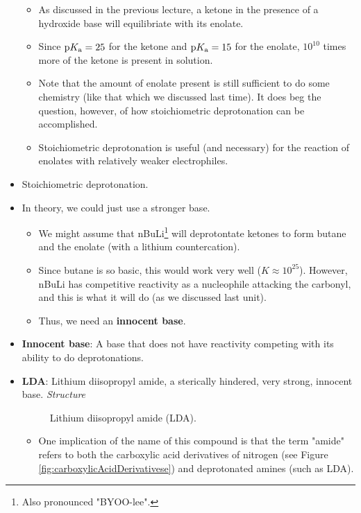 \documentclass[../notes.tex]{subfiles}
\begin{document}
\begin{itemize}
    \begin{itemize}
        \item As discussed in the previous lecture, a ketone in the presence of a hydroxide base will equilibriate with its enolate.
        \item Since $\text{p}K_\text{a}=25$ for the ketone and $\text{p}K_\text{a}=15$ for the enolate, $10^{10}$ times more of the ketone is present in solution.
        \item Note that the amount of enolate present is still sufficient to do some chemistry (like that which we discussed last time). It does beg the question, however, of how stoichiometric deprotonation can be accomplished.
        \item Stoichiometric deprotonation is useful (and necessary) for the reaction of enolates with relatively weaker electrophiles.
    \end{itemize}
    \item Stoichiometric deprotonation.
    \item In theory, we could just use a stronger base.
    \begin{itemize}
        \item We might assume that nBuLi\footnote{Also pronounced "BYOO-lee".} will deprotontate ketones to form butane and the enolate (with a lithium countercation).
        \item Since butane is so basic, this would work very well ($K\approx 10^{25}$). However, nBuLi has competitive reactivity as a nucleophile attacking the carbonyl, and this is what it will do (as we discussed last unit).
        \item Thus, we need an \textbf{innocent base}.
    \end{itemize}
    \item \textbf{Innocent base}: A base that does not have reactivity competing with its ability to do deprotonations.
    \item \textbf{LDA}: Lithium diisopropyl amide, a sterically hindered, very strong, innocent base. \emph{Structure}
    \begin{figure}[h!]
        \centering
        \footnotesize
        \caption{Lithium diisopropyl amide (LDA).}
        \label{fig:LDA}
    \end{figure}
    \begin{itemize}
        \item One implication of the name of this compound is that the term "amide" refers to both the carboxylic acid derivatives of nitrogen (see Figure \ref{fig:carboxylicAcidDerivativese}) and deprotonated amines (such as LDA).

\end{itemize}
\end{itemize}
\end{document}
